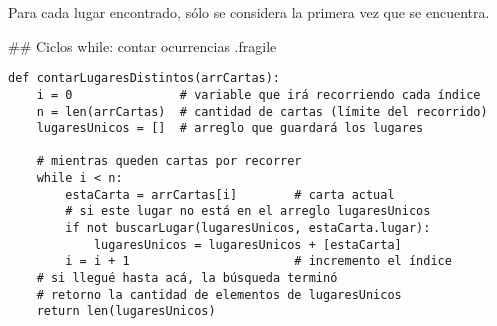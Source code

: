 \bgnblockidea
Para cada lugar encontrado, sólo se considera la primera vez que se encuentra.
\trmblockidea

## Ciclos while: contar ocurrencias {.fragile}


\begin{lstlisting}[style=frame02]
def contarLugaresDistintos(arrCartas):
    i = 0               # variable que irá recorriendo cada índice
    n = len(arrCartas)  # cantidad de cartas (límite del recorrido)
    lugaresUnicos = []  # arreglo que guardará los lugares

    # mientras queden cartas por recorrer
    while i < n:
        estaCarta = arrCartas[i]        # carta actual
        # si este lugar no está en el arreglo lugaresUnicos
        if not buscarLugar(lugaresUnicos, estaCarta.lugar):
            lugaresUnicos = lugaresUnicos + [estaCarta]
        i = i + 1                       # incremento el índice
    # si llegué hasta acá, la búsqueda terminó
    # retorno la cantidad de elementos de lugaresUnicos
    return len(lugaresUnicos)
\end{lstlisting}



